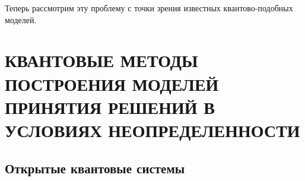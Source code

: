 Теперь рассмотрим эту проблему с точки зрения известных квантово-подобных моделей.
%

\chapter{КВАНТОВЫЕ МЕТОДЫ ПОСТРОЕНИЯ МОДЕЛЕЙ ПРИНЯТИЯ РЕШЕНИЙ В УСЛОВИЯХ НЕОПРЕДЕЛЕННОСТИ}

\section{Открытые квантовые системы}


